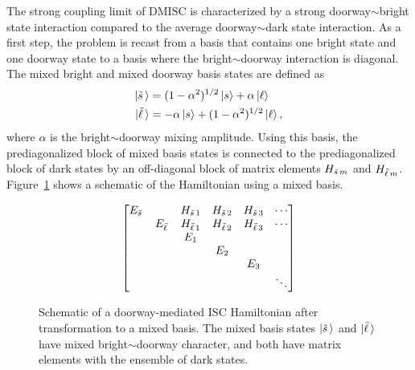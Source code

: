 The strong coupling limit of DMISC is characterized by a strong
doorway$\sim$bright state interaction compared to the average
doorway$\sim$dark state interaction. As a first step, the problem is
recast from a basis that contains one bright state and one doorway
state to a basis where the bright$\sim$doorway interaction is
diagonal.  The mixed bright and mixed doorway basis states are defined
as
\begin{equation}
  \label{eq:mixed-basis-def}
  \begin{split}
    \mathinner{|{\tilde{s}\,}\rangle} & = (1-\alpha^2)^{1/2} \mathinner{|{s}\rangle} + \alpha \mathinner{|{\ell}\rangle} \\
    \mathinner{|{\tilde{\ell}\,}\rangle} & = - \alpha \mathinner{|{s}\rangle} + (1-\alpha^2)^{1/2} \mathinner{|{\ell}\rangle},
  \end{split}
\end{equation}
where $\alpha$ is the bright$\sim$doorway mixing amplitude. Using this
basis, the prediagonalized block of mixed basis states is connected to
the prediagonalized block of dark states by an off-diagonal block of
matrix elements $H_{\tilde{s}\, m}$ and $H_{\tilde{\ell}\,
  m}$. Figure~\ref{fig:matrix-mixed} shows a schematic of the
Hamiltonian using a mixed basis.

\begin{figure}
  \caption{Schematic of a doorway-mediated ISC Hamiltonian after
    transformation to a mixed basis. The mixed basis states
    $\mathinner{|{\tilde{s}\,}\rangle}$ and $\mathinner{|{\tilde{\ell}\,}\rangle}$ have mixed bright$\sim$doorway
    character, and both have matrix elements with the ensemble of dark
    states.}
  \label{fig:matrix-mixed}
  \begin{equation*}
    \begin{bmatrix}
      E_{\tilde{s}\,} & & H_{\tilde{s}\, 1} & H_{\tilde{s}\, 2} & H_{\tilde{s}\, 3} & \dotsm \\
      & E_{\tilde{\ell}\,} & H_{\tilde{\ell}\, 1} & H_{\tilde{\ell}\, 2} & H_{\tilde{\ell}\, 3} & \dotsm \\
      & & E_1 \\
      & & & E_2 \\
      & & & & E_3 \\
      & & & & & \ddots \\
    \end{bmatrix}
  \end{equation*}
\end{figure}


